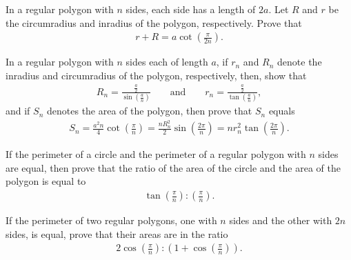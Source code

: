 \begin{question}
    In a regular polygon with $n$ sides, each side has a length of $2a$. Let $R$ and $r$ be the circumradius and inradius of the polygon, respectively. Prove that
    \begin{align*}
        r + R = a \cot\left(\frac{\pi}{2n}\right).
    \end{align*}
\end{question}

\begin{tcolorbox}[title={Makshud's Identities on Regular Polygons}]
    \begin{question}[name={Inradius, Circumradius, and Area of Regular Polygons}]
        In a regular polygon with $n$ sides each of length $a$, if $r_n$ and $R_n$ denote the inradius and circumradius of the polygon, respectively, then, show that
        \begin{align*}
            R_n = \frac{\displaystyle\frac{a}{2}}{\displaystyle\sin\left(\frac{a}{n}\right)} \qquad \text{and} \qquad
            r_n = \frac{\displaystyle\frac{a}{2}}{\displaystyle\tan\left(\frac{a}{n}\right)},
        \end{align*}
         and if $S_n$ denotes the area of the polygon, then prove that $S_n$ equals
         \begin{align*}
             S_n = \frac{a^2n}{4}\cot\left(\frac{\pi}{n}\right) = \frac{nR_n^2}{2}\sin\left(\frac{2\pi}{n}\right) = nr_n^2\tan\left(\frac{2\pi}{n}\right).
         \end{align*}
    \end{question}
\end{tcolorbox}



\begin{question}
    If the perimeter of a circle and the perimeter of a regular polygon with $n$ sides are equal, then prove that the ratio of the area of the circle and the area of the polygon is equal to
    \begin{align*}
        \tan\left(\frac{\pi}{n}\right):\left(\frac{\pi}{n}\right).
    \end{align*}
\end{question}

\begin{question}
    If the perimeter of two regular polygons, one with $n$ sides and the other with $2n$ sides, is equal, prove that their areas are in the ratio
    \begin{align*}
        2\cos\left(\frac{\pi}{n}\right) : \left(1+\cos\left(\frac{\pi}{n}\right)\right).
    \end{align*}
\end{question}

